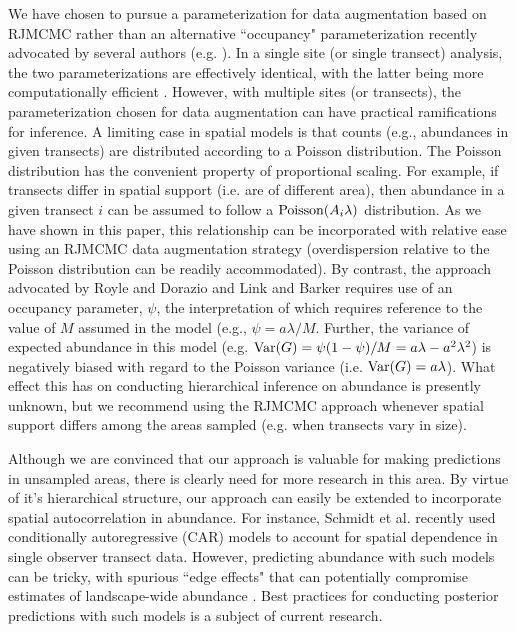 \documentclass[10pt]{article}
\begin{document}
We have chosen to pursue a parameterization for data augmentation based on RJMCMC \cite{DurbanElston2005} rather than an alternative ``occupancy" parameterization recently advocated by several authors (e.g. \cite{RoyleDorazio2008,LinkBarker2010}).  In a single site (or single transect) analysis, the two parameterizations are effectively identical, with the latter being more computationally efficient \cite{LinkBarker2010}.  However, with multiple sites (or transects), the parameterization chosen for data augmentation can have practical ramifications for inference.  A limiting case in spatial models is that counts (e.g., abundances in given transects) are distributed according to a Poisson distribution.  The Poisson distribution has the convenient property of proportional scaling.  For example, if transects differ in spatial support (i.e. are of different area), then abundance in a given transect $i$ can be assumed to follow a ${\rm Poisson}(A_i\lambda)$ distribution.  As we have shown in this paper, this relationship can be incorporated with relative ease using an RJMCMC data augmentation strategy (overdispersion relative to the Poisson distribution can be readily accommodated). By contrast, the approach advocated by Royle and Dorazio \cite{RoyleDorazio2008} and Link and Barker \cite{LinkBarker2010} requires use of an occupancy parameter, $\psi$, the interpretation of which requires reference to the value of $M$ assumed in the model (e.g., $\psi=a\lambda/M$.  Further, the variance of expected abundance in this model (e.g. ${\rm Var}(G)=\psi (1-\psi)/M = a\lambda-a^2\lambda^2$) is negatively biased with regard to the Poisson variance (i.e. ${\rm Var}(G)=a\lambda$).  What effect this has on conducting hierarchical inference on abundance is presently unknown, but we recommend using the RJMCMC approach whenever spatial support differs among the areas sampled (e.g. when transects vary in size).

Although we are convinced that our approach is valuable for making predictions in unsampled areas, there is clearly need for more research in this area.  By virtue of it's hierarchical structure, our approach can easily be extended to incorporate spatial autocorrelation in abundance.  For instance, Schmidt et al. \cite{SchmidtEtAl2012} recently used conditionally autoregressive (CAR) models to account for spatial dependence in single observer transect data.  However, predicting abundance with such models can be tricky, with spurious ``edge effects" that can potentially compromise estimates of landscape-wide abundance \cite{VerHoefJansen2007}.  Best practices for conducting posterior predictions with such models is a subject of current research.
\end{document}
